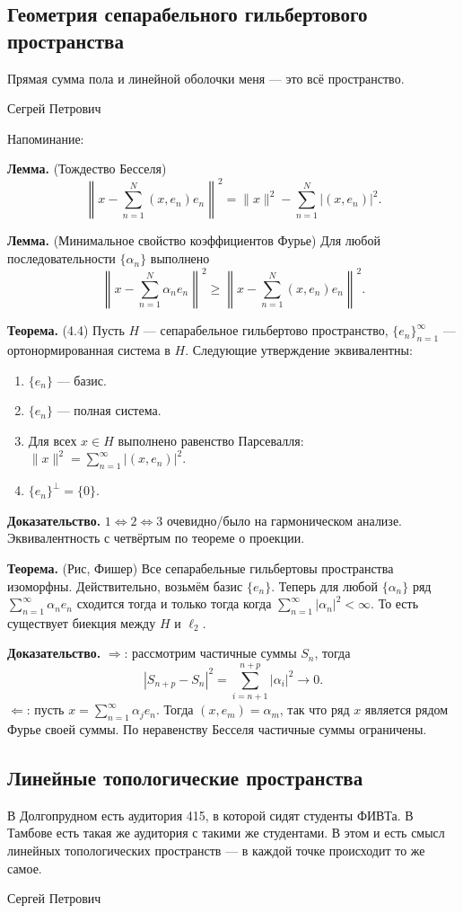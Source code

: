 \QED

\subsection{Геометрия сепарабельного гильбертового пространства}
\epigraph{Прямая сумма пола и линейной оболочки меня --- это всё пространство.}{Сегрей Петрович}
Напоминание:

\textbf{Лемма.} (Тождество Бесселя)
\[
    \left\|x - \sum_{n=1}^{N} (x, e_n)e_n \right\|^2 = \|x\|^2 - \sum_{n=1}^{N} |(x, e_n)|^2.
\]

\textbf{Лемма.} (Минимальное свойство коэффициентов Фурье)
Для любой последовательности $\{\alpha_n\}$ выполнено
\[
    \left\| x - \sum_{n=1}^{N} \alpha_n e_n \right\|^2 \ge \left\|x - \sum_{n=1}^{N} (x, e_n) e_n \right\|^2.
\]

\textbf{Теорема.} (4.4)
Пусть $H$ --- сепарабельное гильбертово пространство, $\{e_n\}_{n=1}^\infty$ --- ортонормированная система в $H$.
Следующие утверждение эквивалентны:
\begin{enumerate}
    \item $\{e_n\}$ --- базис.
    \item $\{e_n\}$ --- полная система.
    \item Для всех $x \in H$ выполнено равенство Парсевалля: $\|x\|^2 = \sum_{n=1}^{\infty} |(x, e_n)|^2$.
    \item $\{e_n\}^\bot = \{0\}$.
\end{enumerate}

\textbf{Доказательство.} 
$1 \iff 2 \iff 3$ очевидно/было на гармоническом анализе.
Эквивалентность с четвёртым по теореме о проекции.

\QED

\textbf{Теорема.} (Рис, Фишер) Все сепарабельные гильбертовы пространства изоморфны.
Действительно, возьмём базис $\{e_n\}$.
Теперь для любой $\{\alpha_n\}$ ряд $\sum_{n=1}^{\infty} \alpha_n e_n$ сходится тогда и только тогда когда $\sum_{n=1}^{\infty} |\alpha_n|^2 < \infty$.
То есть существует биекция между $H$ и $\ell_2$.

\textbf{Доказательство.} $\Rightarrow$: рассмотрим частичные суммы $S_n$, тогда 
\[
    |S_{n+p} - S_n|^2 = \sum_{i=n+1}^{n+p} |\alpha_i|^2 \to 0.
\]
$\Leftarrow$: пусть $x = \sum_{n=1}^{\infty} \alpha_j e_n$. Тогда $(x, e_m) = \alpha_m$, так что ряд $x$ является рядом Фурье своей суммы.
По неравенству Бесселя частичные суммы ограничены.

\QED

\subsection{Линейные топологические пространства}
\epigraph{В Долгопрудном есть аудитория 415, в которой сидят студенты ФИВТа. В Тамбове есть такая же аудитория с такими же студентами.
В этом и есть смысл линейных топологических пространств --- в каждой точке происходит то же самое.}{Сергей Петрович}

